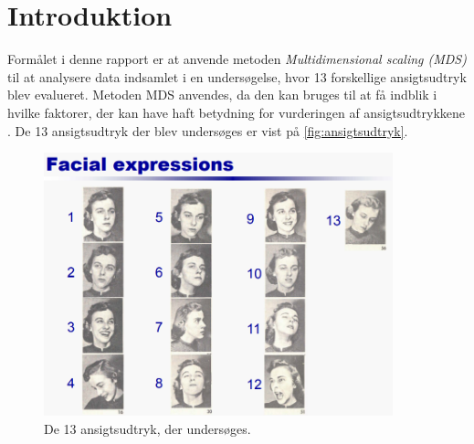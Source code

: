 \section*{Introduktion}
\label{Introduktion}
%
Formålet i denne rapport er at anvende metoden \textit{Multidimensional scaling (MDS)} til at analysere data indsamlet i en undersøgelse, hvor 13 forskellige ansigtsudtryk blev evalueret. Metoden MDS anvendes, da den kan bruges til at få indblik i hvilke faktorer, der kan have haft betydning for vurderingen af ansigtsudtrykkene \parencite[p.2]{Wickelmaier2003}. De 13 ansigtsudtryk der blev undersøges er vist på \autoref{fig:ansigtsudtryk}. 

\begin{figure}[H]
\centering
\includegraphics[width = 0.9\textwidth]{Figure/FacialExpressions.PNG} 
\caption{De 13 ansigtsudtryk, der undersøges.}
\label{fig:ansigtsudtryk}
\end{figure}

